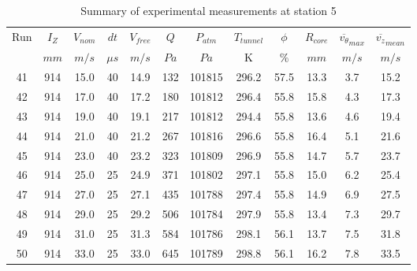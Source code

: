 \begin{table}[H]
\begin{center}
\begin{tabular}{|cccccccccccc|}
	\hline
	Run & $I_Z$ & $V_{nom}$ & $dt$ & $V_{free}$ & $Q$ & $P_{atm}$ & $T_{tunnel}$ & $\phi$ & $R_{core}$ & $\overline{v_{\theta}}_{max}$ & $\overline{v_{z}}_{mean}$\\
	  & $mm$ & $m/s$ & $\mu s$ & $m/s$ & $Pa$ & $Pa$ & K & $\%$ & $mm$ & $m/s$ & $m/s$\\
	\hline
	41 & 914 & 15.0 & 40 & 14.9 & 132 & 101815 & 296.2 & 57.5 & 13.3 & 3.7 & 15.2\\
	42 & 914 & 17.0 & 40 & 17.2 & 180 & 101812 & 296.4 & 55.8 & 15.8 & 4.3 & 17.3\\
	43 & 914 & 19.0 & 40 & 19.1 & 217 & 101812 & 294.4 & 55.8 & 13.6 & 4.6 & 19.4\\
	44 & 914 & 21.0 & 40 & 21.2 & 267 & 101816 & 296.6 & 55.8 & 16.4 & 5.1 & 21.6\\
	45 & 914 & 23.0 & 40 & 23.2 & 323 & 101809 & 296.9 & 55.8 & 14.7 & 5.7 & 23.7\\
	46 & 914 & 25.0 & 25 & 24.9 & 371 & 101802 & 297.1 & 55.8 & 15.0 & 6.2 & 25.4\\
	47 & 914 & 27.0 & 25 & 27.1 & 435 & 101788 & 297.4 & 55.8 & 14.9 & 6.9 & 27.5\\
	48 & 914 & 29.0 & 25 & 29.2 & 506 & 101784 & 297.9 & 55.8 & 13.4 & 7.3 & 29.7\\
	49 & 914 & 31.0 & 25 & 31.3 & 584 & 101786 & 298.1 & 56.1 & 13.7 & 7.5 & 31.8\\
	50 & 914 & 33.0 & 25 & 33.0 & 645 & 101789 & 298.8 & 56.1 & 16.2 & 7.8 & 33.5\\
	\hline
\end{tabular}
\caption{Summary of experimental measurements at station 5}
\label{table:experiment_results_5}
\end{center}
\end{table}
